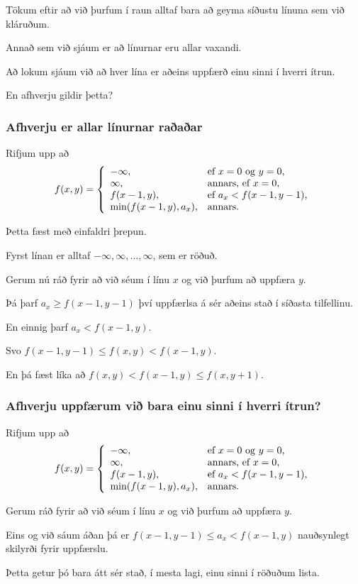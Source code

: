 {
    {
        \item<1-> Tökum eftir að við þurfum í raun alltaf bara að geyma síðustu línuna sem við kláruðum.
        \item<2-> Annað sem við sjáum er að línurnar eru allar vaxandi.
        \item<3-> Að lokum sjáum við að hver lína er aðeins uppfærð einu sinni í hverri ítrun.
        \item<4-> En afhverju gildir þetta?
    }
}

{
    \frametitle{Afhverju er allar línurnar raðaðar}
    {
        \item<1-> Rifjum upp að
        \[
            f(x, y) = \left \{
            \env{array}
            { {l l}
                -\infty, & \text{ef $x = 0$ og $y = 0$,} \\
                \infty, & \text{annars, ef $x = 0$,} \\
                f(x - 1, y), & \text{ef $a_x < f(x - 1, y - 1)$,} \\
                \min(f(x - 1, y), a_x), & \text{annars.}
            }
            \right .
        \]
        \item<2-> Þetta fæst með einfaldri þrepun.
        \item<3-> Fyrst línan er alltaf $-\infty, \infty, \dots, \infty$, sem er röðuð.
        \item<4-> Gerum nú ráð fyrir að við séum í línu $x$ og við þurfum að uppfæra $y$.
        \item<5-> Þá þarf $a_x \geq f(x - 1, y - 1)$ því uppfærlsa á sér aðeins stað í síðasta tilfellinu.
        \item<6-> En einnig þarf $a_x < f(x - 1, y)$.
        \item<7-> Svo $f(x - 1, y - 1) \leq f(x, y) < f(x - 1, y)$.
        \item<8-> En þá fæst líka að $f(x, y) < f(x - 1,y) \leq f(x, y + 1)$.
    }
}

{
    \frametitle{Afhverju uppfærum við bara einu sinni í hverri ítrun?}
    {
        \item<1-> Rifjum upp að
        \[
            f(x, y) = \left \{
            \env{array}
            { {l l}
                -\infty, & \text{ef $x = 0$ og $y = 0$,} \\
                \infty, & \text{annars, ef $x = 0$,} \\
                f(x - 1, y), & \text{ef $a_x < f(x - 1, y - 1)$,} \\
                \min(f(x - 1, y), a_x), & \text{annars.}
            }
            \right .
        \]
        \item<2-> Gerum ráð fyrir að við séum í línu $x$ og við þurfum að uppfæra $y$.
        \item<3-> Eins og við sáum áðan þá er $f(x - 1, y - 1) \leq a_x < f(x - 1, y)$ nauðsynlegt skilyrði fyrir uppfærslu.
        \item<4-> Þetta getur þó bara átt sér stað, í mesta lagi, einu sinni í röðuðum lista.
    }
}

